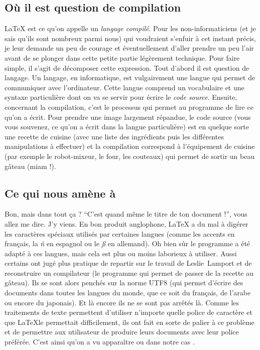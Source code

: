 \documentclass[notitlepage,onecolumn,twoside,12pt,final]{article}
\begin{document}
		\subsection{Où il est question de compilation}
			\LaTeX{} est ce qu'on appelle un \emph{langage compilé}. Pour les non-informaticiens (et je sais qu'ils sont nombreux parmi nous) qui voudraient s'enfuir à cet instant précis, je leur demande un peu de courage et éventuellement d'aller prendre un peu l'air avant de se plonger dans cette petite partie légèrement technique. Pour faire simple, il s'agit de décomposer cette expression. Tout d'abord il est question de langage. Un langage, en informatique, est vulgairement une langue qui permet de communiquer avec l'ordinateur. Cette langue comprend un vocabulaire et une syntaxe particulière dont on va se servir pour écrire le \emph{code source}. Ensuite, concernant la compilation, c'est le processus qui permet au programme de lire ce qu'on a écrit. Pour prendre une image largement répandue, le code source (vous vous souvenez, ce qu'on a écrit dans la langue particulière) est en quelque sorte une recette de cuisine (avec une liste des ingrédients puis les différentes manipulations à effectuer) et la compilation correspond à l'équipement de cuisine (par exemple le robot-mixeur, le four, les couteaux) qui permet de sortir un beau gâteau (miam !).
			
		\subsection{Ce qui nous amène à \XeLaTeX{}}
			Bon, mais \XeLaTeX{} dans tout ça ? \enquote{C'est quand même le titre de ton document !}, vous allez me dire. J'y viens. En bon produit anglophone, \LaTeX{} a du mal à digérer les caractères spéciaux utilisés par certaines langues (comme les accents en français, la \emph{ñ} en espagnol ou le \emph{\ss{}} en allemand). Oh bien sûr le programme a été adapté à ces langues, mais cela est plus ou moins laborieux à utiliser. Aussi certains ont jugé plus pratique de repartir sur le travail de Leslie~Lamport et de reconstruire un compilateur (le programme qui permet de passer de la recette au gâteau). Ils se sont alors penchés sur la norme UTF8 (qui permet d'écrire des documents dans toutes les langues du monde, que ce soit du français, de l'arabe ou encore du japonais). Et là encore ils ne se sont pas arrêtés là. Comme les traitements de texte permettent d'utiliser n'importe quelle police de caractère et que \LaTeX le permettait difficilement, ils ont fait en sorte de palier à ce problème et de permettre aux utilisateur de produire leurs documents avec leur police préférée. C'est ainsi qu'on a vu apparaître \LuaTeX{} ou dans notre cas \XeLaTeX{}.
			
\end{document}
